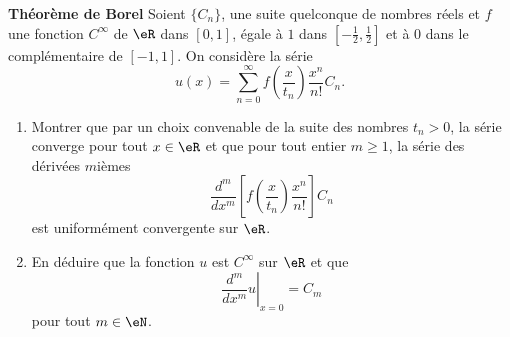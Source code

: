 

\begin{exercice}\label{exo_I-1-16}

{\bf Théorème de Borel} Soient $\{ C_n \}$, une suite quelconque de nombres réels et $f$ une fonction $C^{\infty}$ de $\eR$ dans $[0,1]$, égale à $1$ dans $[-\frac{ 1 }{2},\frac{1}{ 2 }]$ et à $0$ dans le complémentaire de $[-1,1]$. On considère la série
\begin{equation}
	u(x)=\sum_{n=0}^{\infty}f\left( \frac{ x }{ t_n } \right)\frac{ x^n }{ n! }C_n.
\end{equation}
\begin{enumerate}
\item Montrer que par un choix convenable de la suite des nombres $t_n>0$, la série converge pour tout $x\in\eR$ et que pour tout entier $m\geq 1$, la série des dérivées $m$ièmes
\begin{equation}
	\frac{ d^m }{ dx^m }\left[ f\left( \frac{ x }{ t_n } \right)\frac{ x^n }{ n! } \right]C_n
\end{equation}
est uniformément convergente sur $\eR$.

\item En déduire que la fonction $u$ est $C^{\infty}$ sur $\eR$ et que 
\begin{equation}
	\left.\frac{ d^m }{ dx^m }u\right|_{x=0}=C_m
\end{equation}
pour tout $m\in\eN$.
\end{enumerate}

\end{exercice}
